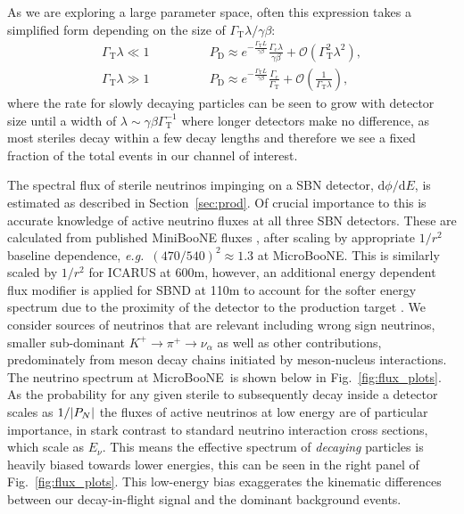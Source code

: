 \documentclass[11pt, a4paper]{article}
\newcommand{\reffig}[1]{Fig.~\ref{#1}}
\newcommand{\refsec}[1]{Section~\ref{#1}}
\def\eg{\emph{e.g.}}
\def\muboone{MicroBooNE}
\def\ster{\ensuremath N}
\begin{document}
As we are exploring a large parameter space, often this expression takes a
simplified form depending on the size of $\Gamma_\text{T}\lambda/\gamma\beta$:
%
\begin{align} 
%
\Gamma_\text{T}\lambda \ll 1\qquad&\qquad P_\text{D} \approx
e^{-\frac{\Gamma_\text{T}L}{\gamma\beta}}\frac{\Gamma_\text{c}\lambda}{\gamma\beta}
+ \mathcal{O}\left(\Gamma_\text{T}^2\lambda^2\right),\label{eq:prob_dec1}\\
%
\Gamma_\text{T}\lambda \gg 1\qquad&\qquad P_\text{D} \approx
e^{-\frac{\Gamma_\text{T}L}{\gamma\beta}}\frac{\Gamma_\text{c}}{\Gamma_\text{T}}
+ \mathcal{O}\left(\frac{1}{\Gamma_\text{T}\lambda}\right),
\label{eq:prob_dec2}
%
\end{align}
%
where the rate for slowly decaying particles can be seen to grow with detector
size until a width of $\lambda\sim\gamma\beta\Gamma_\text{T}^{-1}$ where longer detectors
make no difference, as most steriles decay within a few decay lengths and
therefore we see a fixed fraction of the total events in our channel of
interest. 

The spectral flux of sterile neutrinos impinging on a SBN detector,
$\mathrm{d}\phi/\mathrm{d}E$, is estimated as described in \refsec{sec:prod}.
Of crucial importance to this is accurate knowledge of active neutrino fluxes
at all three SBN detectors. These are calculated from published MiniBooNE
fluxes \cite{AguilarArevalo:2008yp}, after scaling by appropriate $1/r^2$
baseline dependence, \eg\ $(470/540)^2 \approx 1.3$ at \muboone. This is
similarly scaled by $1/r^2$ for ICARUS at 600m, however, an additional energy
dependent flux modifier is applied for SBND at 110m to account for the softer
energy spectrum due to the proximity of the detector to the production target
\cite{Antonello:2015lea}. We consider sources of neutrinos that are relevant
including wrong sign neutrinos, smaller sub-dominant $K^+\rightarrow
\pi^+\rightarrow \nu_\alpha$ as well as other contributions, predominately from
meson decay chains initiated by meson-nucleus interactions. The neutrino
spectrum at \muboone\ is shown below in \reffig{fig:flux_plots}. As the
probability for any given sterile to subsequently decay inside a detector
scales as $1/|P_{\ster}|$ the fluxes of active neutrinos at low
energy are of particular importance, in stark contrast to standard neutrino
interaction cross sections, which scale as $E_\nu$. 
%
This means the effective spectrum of \emph{decaying} particles is heavily biased
towards lower energies, this can be seen in the right panel of
\reffig{fig:flux_plots}.
%
This low-energy bias exaggerates the kinematic differences between our
decay-in-flight signal and the dominant background events. 
\end{document}
